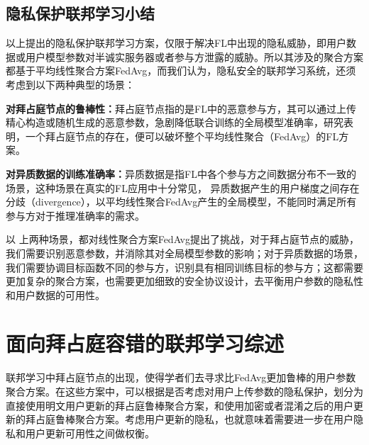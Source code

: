 \subsection{隐私保护联邦学习小结}
以上提出的隐私保护联邦学习方案，仅限于解决FL中出现的隐私威胁，即用户数据或用户模型参数对半诚实服务器或者参与方泄露的威胁。所以其涉及的聚合方案都基于平均线性聚合方案FedAvg\cite{mcmahan2017communication}，而我们认为，隐私安全的联邦学习系统，还须考虑到以下两种典型的场景：
\begin{compactitem}
	\item \textbf{对拜占庭节点的鲁棒性：}拜占庭节点指的是FL中的恶意参与方，其可以通过上传精心构造或随机生成的恶意参数，急剧降低联合训练的全局模型准确率，研究\cite{blanchard2017machine}表明，一个拜占庭节点的存在，便可以破坏整个平均线性聚合（FedAvg）的FL方案。
	\item \textbf{对异质数据的训练准确率：}异质数据是指FL中各个参与方之间数据分布不一致的场景，这种场景在真实的FL应用中十分常见\cite{li2020federated, gao2022feddc, ghosh2020efficient, briggs2020federated}，
	异质数据产生的用户梯度之间存在分歧（divergence），以平均线性聚合FedAvg产生的全局模型，不能同时满足所有参与方对于推理准确率的需求。
\end{compactitem}
以 上两种场景，都对线性聚合方案FedAvg提出了挑战，对于拜占庭节点的威胁，我们需要识别恶意参数，并消除其对全局模型参数的影响；对于异质数据的场景，我们需要协调目标函数不同的参与方，识别具有相同训练目标的参与方；这都需要更加复杂的聚合方案，也需要更加细致的安全协议设计，去平衡用户参数的隐私性和用户数据的可用性。

\section{面向拜占庭容错的联邦学习综述}
\label{sec:byzantine}
联邦学习中拜占庭节点的出现，使得学者们去寻求比FedAvg更加鲁棒的用户参数聚合方案\cite{blanchard2017machine, guerraoui2018hidden, yin2018byzantine, DBLP:conf/ndss/CaoF0G21, he2020secure, hashemi2021byzantine, khazbak2020mlguard, liu2021privacy, nguyen2022flame, hao2021efficient, dong2021flod}。在这些方案中，可以根据是否考虑对用户上传参数的隐私保护，划分为直接使用明文用户更新的拜占庭鲁棒聚合方案\cite{blanchard2017machine, guerraoui2018hidden, yin2018byzantine, DBLP:conf/ndss/CaoF0G21}，和使用加密或者混淆之后的用户更新的拜占庭鲁棒聚合方案\cite{he2020secure, hashemi2021byzantine, khazbak2020mlguard, liu2021privacy, nguyen2022flame, hao2021efficient, dong2021flod}。考虑用户更新的隐私，也就意味着需要进一步在用户隐私和用户更新可用性之间做权衡。

